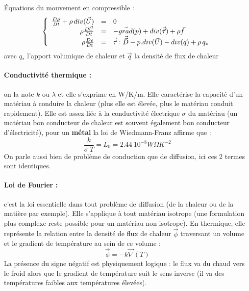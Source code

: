 
Équations du mouvement en compressible :
\[
\left\{
\begin{array}{r c l}
\frac{D\rho}{Dt}+\rho\,div(\vec{U}) &=& 0 \\
\rho\frac{D\vec{U}}{Dt} &=& -\vec{grad}(p)+div(\vec{\vec{\tau}})+\rho\vec{f} \\
\rho\frac{De}{Dt} &=& \vec{\vec{\tau}}:\vec{\vec{D}}-p.div(\vec{U})-div(\vec{q})+\rho\,q_*
\end{array}
\right.
\]
avec $q_*$ l'apport volumique de chaleur et $\vec{q}$ la densité de flux de chaleur


\paragraph{Conductivité thermique :}on la note $k$ ou $\lambda$ et elle s'exprime en W/K/m. Elle caractérise la capacité d'un matériau à conduire la chaleur (plus elle est élevée, plus le matériau conduit rapidement). Elle est assez liée à la conductivité électrique $\sigma$ du matériau (un matériau bon conducteur de chaleur est souvent également bon conducteur d'électricité), pour un \textbf{métal} la loi de Wiedmann-Franz affirme que :
%
\begin{equation}
\frac{k}{\sigma~T} = L_0 = 2.44~10^{-8} W\Omega K^{-2}
\end{equation}
%
On parle aussi bien de problème de conduction que de diffusion, ici ces 2 termes sont identiques.


\paragraph{Loi de Fourier :}c'est la loi essentielle dans tout problème de diffusion (de la chaleur ou de la matière par exemple). Elle s'applique à tout matériau isotrope (une formulation plus complexe reste possible pour un matériau non isotrope). En thermique, elle représente la relation entre la densité de flux de chaleur $\vec{\phi}$ traversant un volume et le gradient de température au sein de ce volume :
%
\begin{equation}
\vec{\phi} = - k \vec{\nabla}(T)
\label{eq:fourier}
\end{equation}
%
La présence du signe négatif est physiquement logique : le flux va du chaud vers le froid alors que le gradient de température suit le sens inverse (il va des températures faibles aux températures élevées).
%
\begin{center}
\end{center}


